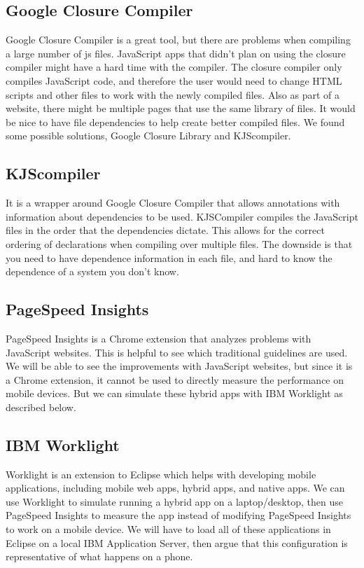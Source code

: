 \documentclass{acm_proc_article-sp}
\begin{document}
\subsection{Google Closure Compiler}
Google Closure Compiler is a great tool, but there are problems when compiling a large number of js files. JavaScript apps that didn’t plan on using the closure compiler might have a hard time with the compiler. The closure compiler only compiles JavaScript code, and therefore the user would need to change HTML scripts and other files to work with the newly compiled files. Also as part of a website, there might be multiple pages that use the same library of files. It would be nice to have file dependencies to help create better compiled files. We found some possible solutions, Google Closure Library and KJScompiler.


\subsection{KJScompiler}
It is a wrapper around Google Closure Compiler that allows annotations with information about dependencies to be used. KJSCompiler compiles the JavaScript files in the order that the dependencies dictate. This allows for the correct ordering of declarations when compiling over multiple files. The downside is that you need to have dependence information in each file, and hard to know the dependence of a system you don’t know. 

\subsection{PageSpeed Insights}
PageSpeed Insights is a Chrome extension that analyzes problems with JavaScript websites. This is helpful to see which traditional guidelines are used. We will be able to see the improvements with JavaScript websites, but since it is a Chrome extension, it cannot be used to directly measure the performance on mobile devices. But we can simulate these hybrid apps with IBM Worklight as described below.

\subsection{IBM Worklight}
Worklight is an extension to Eclipse which helps with developing mobile applications, including mobile web apps, hybrid apps, and native apps. We can use Worklight to simulate running a hybrid app on a laptop/desktop, then use PageSpeed Insights to measure the app instead of modifying PageSpeed Insights to work on a mobile device. We will have to load all of these applications in Eclipse on a local IBM Application Server, then argue that this configuration is representative of what happens on a phone.
\end{document}
